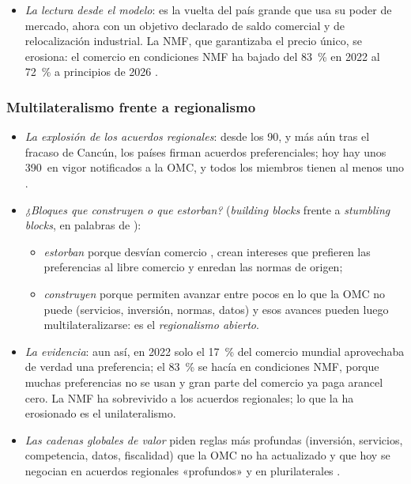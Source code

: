 \documentclass[11pt]{article}
\begin{document}
\begin{itemize}
\item \emph{La lectura desde el modelo}: es la vuelta del país grande que usa su poder de mercado, ahora con un objetivo declarado de saldo comercial y de relocalización industrial. La NMF, que garantizaba el precio único, se erosiona: el comercio en condiciones NMF ha bajado del 83~\% en 2022 al 72~\% a principios de 2026\nocite{OMC2025PerfilesArancelarios,OMC2026Perspectivas} .
\end{itemize}

\subsubsection{Multilateralismo frente a regionalismo}\label{sec:regionalismo}

\begin{itemize}
\item \emph{La explosión de los acuerdos regionales}: desde los 90, y más aún tras el fracaso de Cancún, los países firman acuerdos preferenciales; hoy hay unos 390~en vigor notificados a la OMC, y todos los miembros tienen al menos uno .
\item \emph{¿Bloques que construyen o que estorban?} (\emph{building blocks} frente a \emph{stumbling blocks}, en palabras de ):
  \begin{itemize}
  \item \emph{estorban} porque desvían comercio , crean intereses que prefieren las preferencias al libre comercio y enredan las normas de origen\nocite{Bhagwati1991World};
  \item \emph{construyen} porque permiten avanzar entre pocos en lo que la OMC no puede (servicios, inversión, normas, datos) y esos avances pueden luego multilateralizarse: es el \emph{regionalismo abierto}.
  \end{itemize}
\item \emph{La evidencia}: aun así, en 2022 solo el 17~\% del comercio mundial aprovechaba de verdad una preferencia; el 83~\% se hacía en condiciones NMF, porque muchas preferencias no se usan y gran parte del comercio ya paga arancel cero\nocite{OMC2025PerfilesArancelarios}. La NMF ha sobrevivido a los acuerdos regionales; lo que la ha erosionado es el unilateralismo.
\item \emph{Las cadenas globales de valor} piden reglas más profundas (inversión, servicios, competencia, datos, fiscalidad) que la OMC no ha actualizado y que hoy se negocian en acuerdos regionales «profundos» y en plurilaterales .
\end{itemize}
\end{document}
